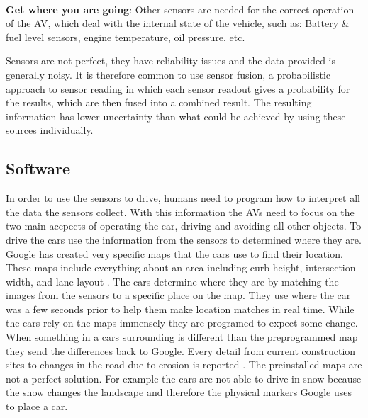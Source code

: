 \documentclass[11pt]{article}
\begin{document}
$~$\\
\textbf{Get where you are going}:
Other sensors are needed for the correct operation of the AV, which deal with the internal state of the vehicle, such as: Battery \& fuel level sensors, engine temperature, oil pressure, etc.

Sensors are not perfect, they have reliability issues and the data provided is generally noisy. It is therefore common to use sensor fusion, a probabilistic approach to sensor reading in which each sensor readout gives a probability for the results, which are then fused into a combined result. The resulting information has lower uncertainty than what could be achieved by using these sources individually. \cite{HellstromUmea}

\subsection{Software}
In order to use the sensors to drive, humans need to program how to interpret all the data the sensors collect. With this information the AVs need to focus on the two main accpects of operating the car, driving and avoiding all other objects. To drive the cars use the information from the sensors to determined where they are. Google has created very specific maps that the cars use to find their location. These maps include everything about an area including curb height, intersection width, and lane layout \cite{chrisurmson2016}.
The cars determine where they are by matching the images from the sensors to
a specific place on the map. They use where the car was a few seconds prior to help them make location matches in real
time. While the cars rely on the maps immensely they are programed to expect some change. When something in a cars surrounding is
different than the preprogrammed map they send the differences back to Google. Every detail from current construction sites to changes in the road due to erosion
is reported \cite{chrisurmson2016}. The preinstalled maps are not a perfect solution. For example the
cars are not able to drive in snow because the snow changes the landscape and therefore the physical markers Google
uses to place a car\cite{chrisurmson2016}. 
\end{document}
